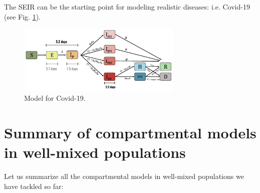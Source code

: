 \documentclass[../main/main.tex]{subfiles}
\begin{document}
The SEIR can be the starting point for modeling realistic diseases: i.e. Covid-19 (see Fig. \ref{fig:05_2}).
\begin{figure}[h!]
\centering
\includegraphics[width=0.7\textwidth]{../lessons/image/05/2.png}
\caption{\label{fig:05_2} Model for Covid-19.}
\end{figure}

\section{Summary of compartmental models in well-mixed populations}
Let us summarize all the compartmental models in well-mixed populations we have tackled so far:
\end{document}
